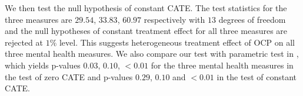 \documentclass[
  12pt,
  12pt]{article}
\numberwithin{equation}{section}
\theoremstyle{definition}
\theoremstyle{plain}
\theoremstyle{plain}
\theoremstyle{remark}
\begin{document}
\begin{table}

\caption{\label{tbl-ocptest}Test Results for the CATE on Mental Health
of the Only Children}


\end{table}%

We then test the null hypothesis of constant CATE. The test statistics
for the three measures are \(29.54\), \(33.83\), \(60.97\) respectively
with \(13\) degrees of freedom and the null hypotheses of constant
treatment effect for all three measures are rejected at \(1\%\) level.
This suggests heterogeneous treatment effect of OCP on all three mental
health measures. We also compare our test with parametric test in
\citet{crump2008nonparametric}, which yields p-values \(0.03\),
\(0.10\), \(< 0.01\) for the three mental health measures in the test of
zero CATE and p-values \(0.29\), \(0.10\) and \(< 0.01\) in the test of
constant CATE.
\end{document}
